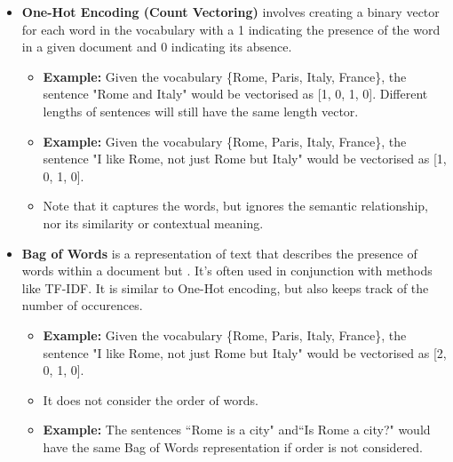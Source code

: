 \begin{itemize}
    \item \textbf{One-Hot Encoding (Count Vectoring)} involves creating a binary vector for each word in the vocabulary with a 1 indicating the presence of the word in a given document and 0 indicating its absence. 
    \begin{itemize}
        \item \textbf{Example:} Given the vocabulary \{Rome, Paris, Italy, France\}, the sentence "Rome and Italy" would be vectorised as [1, 0, 1, 0]. Different lengths of sentences will still have the same length vector.
        \item \textbf{Example:} Given the vocabulary \{Rome, Paris, Italy, France\}, the sentence "I like Rome, not just Rome but Italy" would be vectorised as [1, 0, 1, 0]. 
        \item Note that it captures the words, but ignores the semantic relationship, nor its similarity or contextual meaning.
    \end{itemize}

    \item \textbf{Bag of Words} is a representation of text that describes the presence of words within a document but . It's often used in conjunction with methods like TF-IDF. It is similar to One-Hot encoding, but also keeps track of the number of occurences. 
    \begin{itemize}
        \item \textbf{Example:} Given the vocabulary \{Rome, Paris, Italy, France\}, the sentence "I like Rome, not just Rome but Italy" would be vectorised as [2, 0, 1, 0].  
        \item It does not consider the order of words.
        \item \textbf{Example:} The sentences ``Rome is a city" and``Is Rome a city?" would have the same Bag of Words representation if order is not considered.
    \end{itemize}


\end{itemize}
